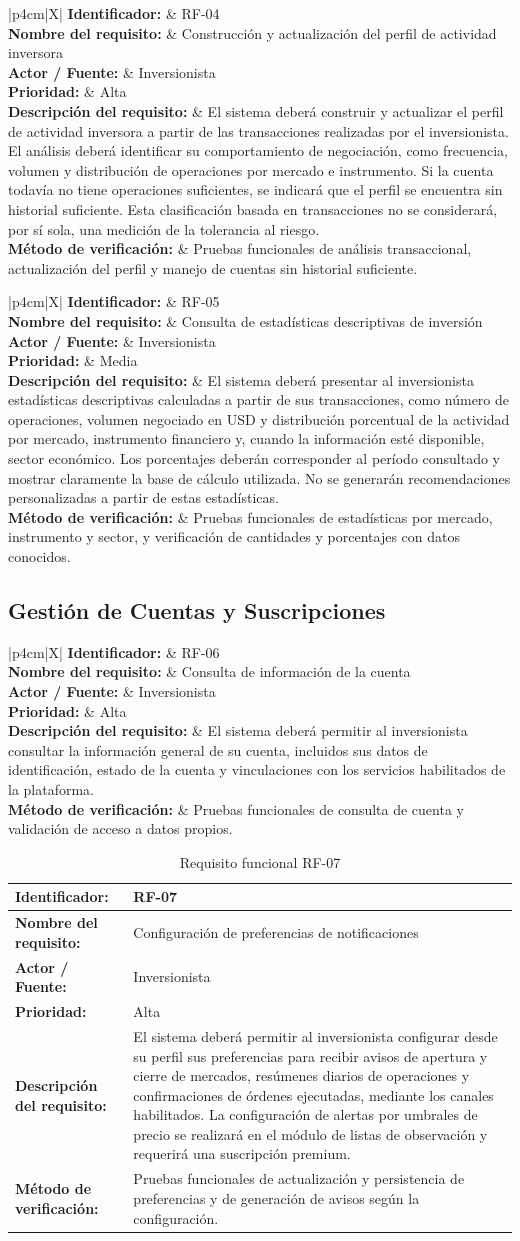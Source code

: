 \documentclass[11pt,a4paper,oneside]{article}
\newcommand{\tablaRequisito}[6]{%
\begin{table}[H]
\centering
\begin{tabularx}{\linewidth}{|p{4cm}|X|}
\hline
\textbf{Identificador:} & #1 \\ \hline
\textbf{Nombre del requisito:} & #2 \\ \hline
\textbf{Actor / Fuente:} & #3 \\ \hline
\textbf{Prioridad:} & #4 \\ \hline
\textbf{Descripción del requisito:} &
#5 \\ \hline
\textbf{Método de verificación:} & #6 \\ \hline
\end{tabularx}
\caption{Requisito funcional #1}
\label{tab:#1}
\end{table}
}
\begin{document}
\tablaRequisito
{RF-04}
{Construcción y actualización del perfil de actividad inversora}
{Inversionista}
{Alta}
{El sistema deberá construir y actualizar el perfil de actividad inversora a partir de las transacciones realizadas por el inversionista. El análisis deberá identificar su comportamiento de negociación, como frecuencia, volumen y distribución de operaciones por mercado e instrumento. Si la cuenta todavía no tiene operaciones suficientes, se indicará que el perfil se encuentra sin historial suficiente. Esta clasificación basada en transacciones no se considerará, por sí sola, una medición de la tolerancia al riesgo.}
{Pruebas funcionales de análisis transaccional, actualización del perfil y manejo de cuentas sin historial suficiente.}


\tablaRequisito
{RF-05}
{Consulta de estadísticas descriptivas de inversión}
{Inversionista}
{Media}
{El sistema deberá presentar al inversionista estadísticas descriptivas calculadas a partir de sus transacciones, como número de operaciones, volumen negociado en USD y distribución porcentual de la actividad por mercado, instrumento financiero y, cuando la información esté disponible, sector económico. Los porcentajes deberán corresponder al período consultado y mostrar claramente la base de cálculo utilizada. No se generarán recomendaciones personalizadas a partir de estas estadísticas.}
{Pruebas funcionales de estadísticas por mercado, instrumento y sector, y verificación de cantidades y porcentajes con datos conocidos.}


\subsection{Gestión de Cuentas y Suscripciones}

\tablaRequisito
{RF-06}
{Consulta de información de la cuenta}
{Inversionista}
{Alta}
{El sistema deberá permitir al inversionista consultar la información general de su cuenta, incluidos sus datos de identificación, estado de la cuenta y vinculaciones con los servicios habilitados de la plataforma.}
{Pruebas funcionales de consulta de cuenta y validación de acceso a datos propios.}


\tablaRequisito
{RF-07}
{Configuración de preferencias de notificaciones}
{Inversionista}
{Alta}
{El sistema deberá permitir al inversionista configurar desde su perfil sus preferencias para recibir avisos de apertura y cierre de mercados, resúmenes diarios de operaciones y confirmaciones de órdenes ejecutadas, mediante los canales habilitados. La configuración de alertas por umbrales de precio se realizará en el módulo de listas de observación y requerirá una suscripción premium.}
{Pruebas funcionales de actualización y persistencia de preferencias y de generación de avisos según la configuración.}
\end{document}
